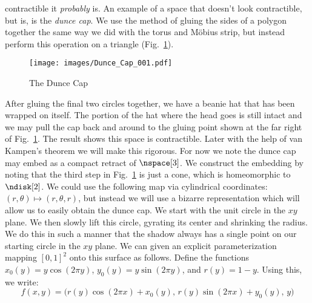 \documentclass{book}                                                           %
\begin{document}
                contractible it \textit{probably} is. An example of a space that
                doesn't look contractible, but is, is the \textit{dunce cap}. We
                use the method of gluing the sides of a polygon together the
                same way we did with the torus and M\"{o}bius strip, but instead
                perform this operation on a triangle
                (Fig.~\ref{fig:Dunce_Cap_001}).
                \begin{figure}
                    \centering
                    \captionsetup{type=figure}
                    \texttt{[image: images/Dunce\_Cap\_001.pdf]}
                    \caption{The Dunce Cap}
                    \label{fig:Dunce_Cap_001}
                \end{figure}
                After gluing the final two circles together, we have a beanie
                hat that has been wrapped on itself. The portion of the hat
                where the head goes is still intact and we may pull the cap back
                and around to the gluing point shown at the far right of
                Fig.~\ref{fig:Dunce_Cap_001}. The result shows this space is
                contractible. Later with the help of van Kampen's theorem we
                will make this rigorous. For now we note the dunce cap may embed
                as a compact retract of $\nspace[3]$. We construct the embedding
                by noting that the third step in Fig.~\ref{fig:Dunce_Cap_001} is
                just a cone, which is homeomorphic to $\ndisk[2]$. We could use
                the following map via cylindrical coordinates:
                $(r,\theta)\mapsto(r,\theta,r)$, but instead we will use a
                bizarre representation which will allow us to easily obtain the
                dunce cap. We start with the unit circle in the $xy$ plane. We
                then slowly lift this circle, gyrating its center and shrinking
                the radius. We do this in such a manner that the shadow always
                has a single point on our starting circle in the $xy$ plane. We
                can given an explicit parameterization mapping $[0,1]^{2}$ onto
                this surface as follows. Define the functions
                $x_{0}(y)=y\cos(2\pi{y})$,
                $y_{0}(y)=y\sin(2\pi{y})$, and $r(y)=1-y$. Using this, we write:
                \begin{equation}
                    \label{eqn:Func_for_Twisted_Cone}
                    f(x,y)=\big(
                        r(y)\cos(2\pi{x})+x_{0}(y),\,
                        r(y)\sin(2\pi{x})+y_{0}(y),\,
                        y
                    \big)
                \end{equation}
\end{document}
